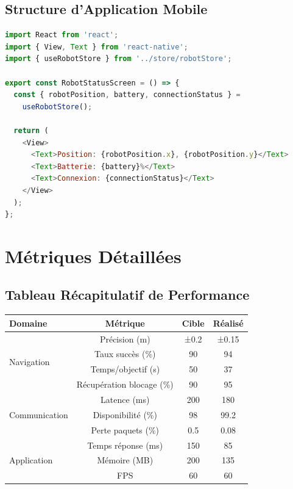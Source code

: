 \documentclass[12pt,a4paper,oneside]{report}
\begin{document}
\section{Structure d'Application Mobile}

\begin{lstlisting}[language=JavaScript]
import React from 'react';
import { View, Text } from 'react-native';
import { useRobotStore } from '../store/robotStore';

export const RobotStatusScreen = () => {
  const { robotPosition, battery, connectionStatus } = 
    useRobotStore();
  
  return (
    <View>
      <Text>Position: {robotPosition.x}, {robotPosition.y}</Text>
      <Text>Batterie: {battery}%</Text>
      <Text>Connexion: {connectionStatus}</Text>
    </View>
  );
};
\end{lstlisting}

\chapter{Métriques Détaillées}

\section{Tableau Récapitulatif de Performance}

\begin{table}[H]
\centering
\begin{tabular}{|l|c|c|c|}
\hline
\textbf{Domaine} & \textbf{Métrique} & \textbf{Cible} & \textbf{Réalisé} \\
\hline
\multirow{4}{*}{Navigation} & Précision (m) & ±0.2 & ±0.15 \\
& Taux succès (\%) & 90 & 94 \\
& Temps/objectif (s) & 50 & 37 \\
& Récupération blocage (\%) & 90 & 95 \\
\hline
\multirow{3}{*}{Communication} & Latence (ms) & 200 & 180 \\
& Disponibilité (\%) & 98 & 99.2 \\
& Perte paquets (\%) & 0.5 & 0.08 \\
\hline
\multirow{3}{*}{Application} & Temps réponse (ms) & 150 & 85 \\
& Mémoire (MB) & 200 & 135 \\
& FPS & 60 & 60 \\
\hline
\end{tabular}
\end{table}
\end{document}
